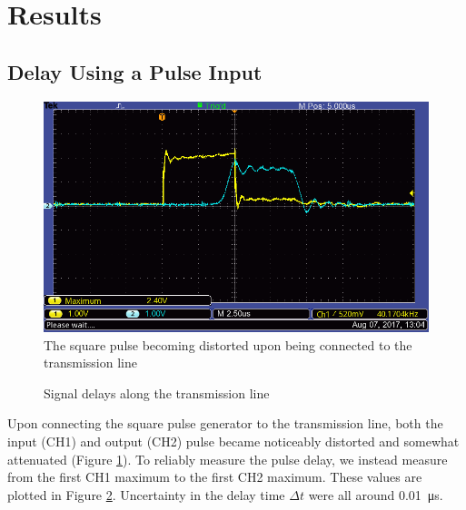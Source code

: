 \documentclass[a4paper]{scrartcl}
\begin{document}
\section{Results}
\subsection{Delay Using a Pulse Input}
\begin{figure}
    \centering
    \includegraphics[width = 15cm]{data/ALL0001/F0001TEK.png}
    \caption{The square pulse becoming distorted upon being connected to the transmission line}
    \label{fig:pulse-distortion}
\end{figure}

\begin{figure}
    \centering
    \caption{Signal delays along the transmission line}
    \label{fig:delays}
\end{figure}

Upon connecting the square pulse generator to the transmission line, both the input (CH1) and output (CH2) pulse became noticeably distorted and somewhat attenuated (Figure \ref{fig:pulse-distortion}). To reliably measure the pulse delay, we instead measure from the first CH1 maximum to the first CH2 maximum. These values are plotted in Figure \ref{fig:delays}. Uncertainty in the delay time \(\Delta t\) were all around \SI{0.01}{\micro\second}.
\end{document}
